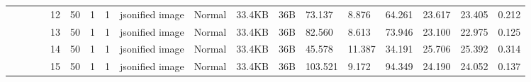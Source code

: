 \begin{landscape}
\begin{table}[]
{\begin{tabular}{@{}ccccllllllllllllll@{}}
                                                                                   &                              &                                &                                                                                                          & 12                                                    & 50                                       & 1                                          & 1                                 & jsonified image                  & Normal                             & 33.4KB                                        & 36B                                             & 73.137                  & 8.876    & 64.261                       & 23.617                  & 23.405   & 0.212                        \\
                                                                                   &                              &                                &                                                                                                          & 13                                                    & 50                                       & 1                                          & 1                                 & jsonified image                  & Normal                             & 33.4KB                                        & 36B                                             & 82.560                  & 8.613    & 73.946                       & 23.100                  & 22.975   & 0.125                        \\
                                                                                   &                              &                                &                                                                                                          & 14                                                    & 50                                       & 1                                          & 1                                 & jsonified image                  & Normal                             & 33.4KB                                        & 36B                                             & 45.578                  & 11.387   & 34.191                       & 25.706                  & 25.392   & 0.314                        \\
                                                                                   &                              &                                &                                                                                                          & 15                                                    & 50                                       & 1                                          & 1                                 & jsonified image                  & Normal                             & 33.4KB                                        & 36B                                             & 103.521                 & 9.172    & 94.349                       & 24.190                  & 24.052   & 0.137                        \\

\end{tabular}}
\end{table}
\end{landscape}
